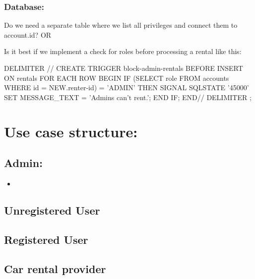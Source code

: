 \documentclass{article}
\begin{document}
\subsubsection{Database:}
Do we need a separate table where we list all privileges and connect them to account.id? OR

Is it best if we implement a check for roles before processing a rental like this:

DELIMITER //
CREATE TRIGGER block-admin-rentals
BEFORE INSERT ON rentals
FOR EACH ROW
BEGIN
    IF (SELECT role FROM accounts WHERE id = NEW.renter-id) = 'ADMIN' THEN
        SIGNAL SQLSTATE '45000' SET MESSAGE\_TEXT = 'Admins can’t rent.';
    END IF;
END//
DELIMITER ;


\section{\textbf{Use case structure:}}

\subsection{Admin:}
\begin{itemize}
    \item 
\end{itemize}

\subsection{Unregistered User}

\subsection{Registered User}

\subsection{Car rental provider}
\end{document}
